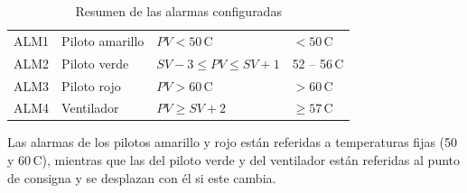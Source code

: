 \begin{table}[H]
	\centering
	\begin{tabularx}{\linewidth}{|C{2cm}|C{2.7cm}|Y|C{3cm}|}
		\hline
		 &  &  &  \\
		\hline
		ALM1 & Piloto amarillo & $PV < 50$\,\textdegree C & $< 50$\,\textdegree C \\
		\hline
		ALM2 & Piloto verde & $SV - 3 \leq PV \leq SV + 1$ & 52 -- 56\,\textdegree C \\
		\hline
		ALM3 & Piloto rojo & $PV > 60$\,\textdegree C & $> 60$\,\textdegree C \\
		\hline
		ALM4 & Ventilador & $PV \geq SV + 2$ & $\geq 57$\,\textdegree C \\
		\hline
	\end{tabularx}
	\caption{Resumen de las alarmas configuradas}
\end{table}

Las alarmas de los pilotos amarillo y rojo están referidas a temperaturas fijas (50 y 60\,\textdegree C), mientras que las del piloto verde y del ventilador están referidas al punto de consigna y se desplazan con él si este cambia.
